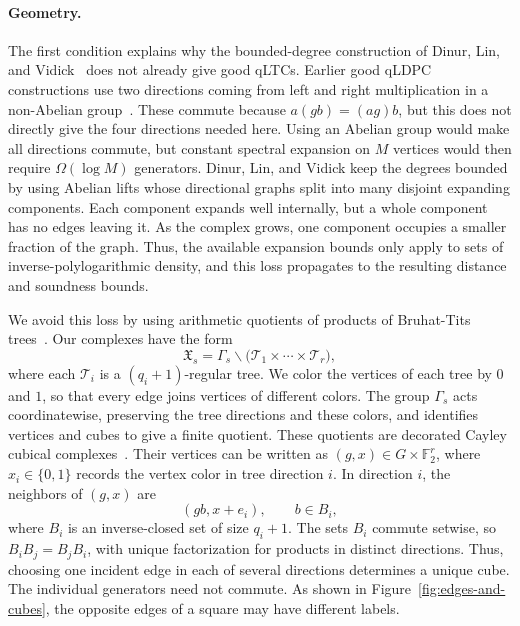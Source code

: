 \documentclass[11pt,letterpaper]{article}
\theoremstyle{definition}
\theoremstyle{remark}
\newcommand{\F}{\mathbb F}
\newcommand{\X}{\mathfrak{X}}
\begin{document}
\paragraph{Geometry.}
The first condition explains why the bounded-degree construction of Dinur, Lin, and Vidick~\cite{DinurLinVidick2024} does not already give good qLTCs. Earlier good qLDPC constructions use two directions coming from left and right multiplication in a non-Abelian group~\cite{PanteleevKalachev2022,LeverrierZemor2022}. These commute because $a(gb)=(ag)b$, but this does not directly give the four directions needed here. Using an Abelian group would make all directions commute, but constant spectral expansion on $M$ vertices would then require $\Omega(\log M)$ generators. Dinur, Lin, and Vidick keep the degrees bounded by using Abelian lifts whose directional graphs split into many disjoint expanding components. Each component expands well internally, but a whole component has no edges leaving it. As the complex grows, one component occupies a smaller fraction of the graph. Thus, the available expansion bounds only apply to sets of inverse-polylogarithmic density, and this loss propagates to the resulting distance and soundness bounds.

We avoid this loss by using arithmetic quotients of products of Bruhat-Tits trees~\cite{RSV2019,HLMRZ2025}. Our complexes have the form
$$
\X_s=\Gamma_s\backslash
\bigl(\mathcal T_1\times\cdots\times\mathcal T_r\bigr),
$$
where each $\mathcal T_i$ is a $(q_i+1)$-regular tree. We color the vertices of each tree by $0$ and $1$, so that every edge joins vertices of different colors. The group $\Gamma_s$ acts coordinatewise, preserving the tree directions and these colors, and identifies vertices and cubes to give a finite quotient. These quotients are decorated Cayley cubical complexes~\cite{HLMRZ2025}. Their vertices can be written as $(g,x)\in G\times\F_2^r$, where $x_i\in\{0,1\}$ records the vertex color in tree direction $i$. In direction $i$, the neighbors of $(g,x)$ are
\[
 (gb,x+e_i),\qquad b\in B_i,
\]
where $B_i$ is an inverse-closed set of size $q_i+1$. The sets $B_i$ commute setwise, so $B_iB_j=B_jB_i$, with unique factorization for products in distinct directions. Thus, choosing one incident edge in each of several directions determines a unique cube. The individual generators need not commute. As shown in Figure~\ref{fig:edges-and-cubes}, the opposite edges of a square may have different labels.
\end{document}
